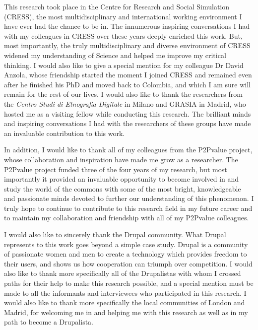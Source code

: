 This research took place in the Centre for Research and Social Simulation (CRESS), the most multidisciplinary and international working environment I have ever had the chance to be in. The innumerous inspiring conversations I had with my colleagues in CRESS over these years deeply enriched this work. But, most importantly, the truly multidisciplinary and diverse environment of CRESS widened my understanding of Science and helped me improve my critical thinking. I would also like to give a special mention for my colleague Dr David Anzola, whose friendship started the moment I joined CRESS and remained even after he finished his PhD and moved back to Colombia, and which I am sure will remain for the rest of our lives. I would also like to thank the researchers from the \textit{Centro Studi di Etnografia Digitale} in Milano and GRASIA in Madrid, who hosted me as a visiting fellow while conducting this research. The brilliant minds and inspiring conversations I had with the researchers of these groups have made an invaluable contribution to this work.

In addition, I would like to thank all of my colleagues from the P2Pvalue project, whose collaboration and inspiration have made me grow as a researcher. The P2Pvalue project funded three of the four years of my research, but most importantly it provided an invaluable opportunity to become involved in and study the world of the commons with some of the most bright, knowledgeable and passionate minds devoted to further our understanding of this phenomenon. I truly hope to continue to contribute to this research field in my future career and to maintain my collaboration and friendship with all of my P2Pvalue colleagues.

I would also like to sincerely thank the Drupal community. What Drupal represents to this work goes beyond a simple case study. Drupal is a community of passionate women and men to create a technology which provides freedom to their users, and shows us how cooperation can triumph over competition. I would also like to thank more specifically all of the Drupalistas with whom I crossed paths for their help to make this research possible, and a special mention must be made to all the informants and interviewees who participated in this research. I would also like to thank more specifically the local communities of London and Madrid, for welcoming me in and helping me with this research as well as in my path to become a Drupalista.

